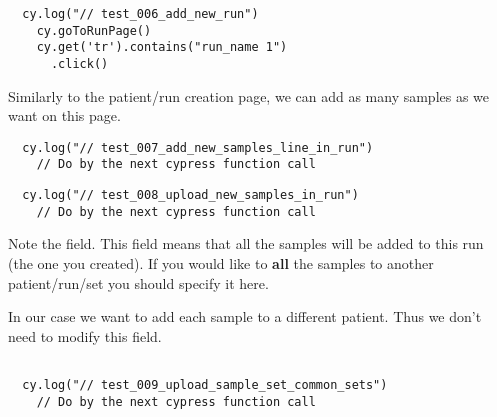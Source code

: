 \begin{verbatim}
  cy.log("// test_006_add_new_run")
    cy.goToRunPage()
    cy.get('tr').contains("run_name 1")
      .click()

\end{verbatim}

Similarly to the patient/run creation page, we can add as many samples as we
want on this page.

\begin{verbatim}
  cy.log("// test_007_add_new_samples_line_in_run")
    // Do by the next cypress function call

\end{verbatim}

\begin{verbatim}
  cy.log("// test_008_upload_new_samples_in_run")
    // Do by the next cypress function call

\end{verbatim}

Note the  field. This field means that all the samples will
be added to this run (the one you created). If you would like to \textbf{all}
the samples to another patient/run/set you should specify it here.

In our case we want to add each sample to a different patient. Thus we don't
need to modify this field.

\begin{verbatim}
 
  cy.log("// test_009_upload_sample_set_common_sets")
    // Do by the next cypress function call

\end{verbatim}

